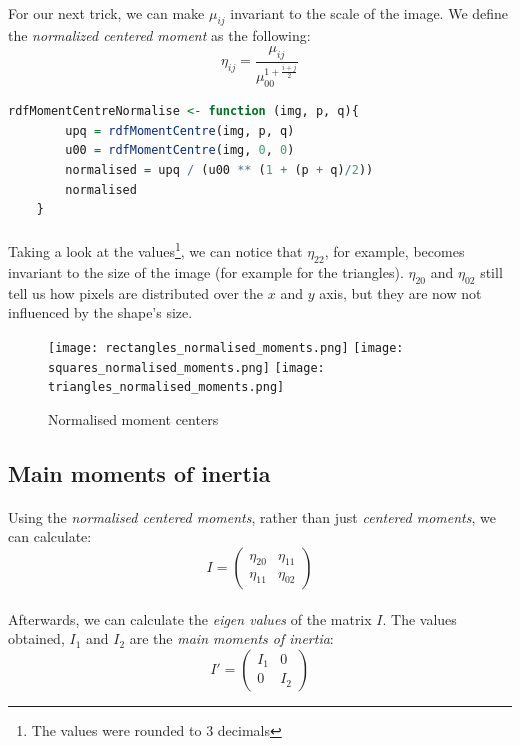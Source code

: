 \paragraph{}
For our next trick, we can make $\mu_{ij}$ invariant to the scale of the image. We define the \emph{normalized centered moment} as the following:
$$\eta_{ij} = \frac{\mu_{ij}}{\mu_{00}^{1 + \frac{i + j}{2}}}$$

\begin{lstlisting}[language=R, caption=Calculating normalised centered moments]
    rdfMomentCentreNormalise <- function (img, p, q){
        upq = rdfMomentCentre(img, p, q)
        u00 = rdfMomentCentre(img, 0, 0)
        normalised = upq / (u00 ** (1 + (p + q)/2))
        normalised
    }
\end{lstlisting}

\clearpage

\paragraph{}
Taking a look at the values\footnote{The values were rounded to 3 decimals}, we can notice that $\eta_{22}$, for example, becomes invariant to the size of the image (for example for the triangles).
$\eta_{20}$ and $\eta_{02}$ still tell us how pixels are distributed over the $x$ and $y$ axis, but they are now not influenced by the shape's size.

\begin{figure}[h]
    \centering
    \texttt{[image: rectangles\_normalised\_moments.png]}
    \texttt{[image: squares\_normalised\_moments.png]}
    \texttt{[image: triangles\_normalised\_moments.png]}
    \caption{Normalised moment centers}
\end{figure}

\subsection{Main moments of inertia}
\paragraph{}
Using the \emph{normalised centered moments}, rather than just \emph{centered moments}, we can calculate:
$$ I = 
\begin{pmatrix}
    \eta_{20} & \eta_{11}\\
    \eta_{11} & \eta_{02}
\end{pmatrix}
$$
\paragraph{}
Afterwards, we can calculate the \emph{eigen values} of the matrix $I$. The values obtained, $I_1$ and $I_2$ are the \emph{main moments of inertia}:
$$ I' = 
\begin{pmatrix}
    I_1 & 0\\
    0 & I_2
\end{pmatrix}
$$


